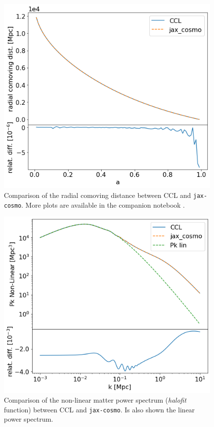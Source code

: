 \documentclass[twocolumn,twocolappendix,nofootinbib,iop]{openjournal}
\newcommand{\nblink}[1]{\href{https://github.com/DifferentiableUniverseInitiative/jax-cosmo-paper/blob/master/notebooks/#1.ipynb}{\faFileCodeO}}
\newcommand{\jaxcosmo}{\texttt{jax-cosmo}}
\begin{document}
\begin{figure}
    \centering
    \includegraphics[width=\columnwidth]{figures/comp_radial_com_dist.png}
    \caption{Comparison of the radial comoving distance between CCL and \jaxcosmo. More plots are available in the  companion notebook \nblink{CCL_comparison}.} 
    \label{fig:chi_comparison}
\end{figure}
\begin{figure}
    \centering
    \includegraphics[width=\columnwidth]{figures/halofit_pk.png}
    \caption{Comparison of the non-linear matter power spectrum (\textit{halofit} function) between CCL and \jaxcosmo. Is also shown the linear power spectrum.}     \label{fig:halofit_comparison}
\end{figure}
\end{document}
